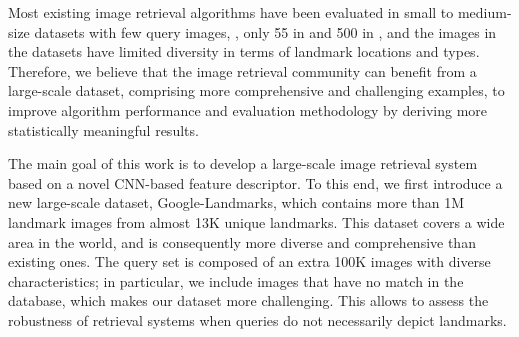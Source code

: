 \documentclass[10pt,twocolumn,letterpaper]{article}
\begin{document}
\iffalse
Despite the recent advances in CNN-based global descriptors for image retrieval, they still suffer from the lack of ability to find patch-level matches between query and database images; it is difficult to retrieve images based on partial matching in the presence of occlusion and background clutter.
In a different recent trend, CNN-based local features are proposed for patch-level matching \cite{han2015matchnet,zagoruyko2015learning,yi2016lift}.
However, these techniques are not optimized specifically for image retrieval and consequently show limited accuracy in practice.
As a result, image retrieval systems relying on long-standing hand-crafted features, such as SIFT~\cite{Lowe2004} or CONGAS~\cite{buddemeier2012systems}, are still widely used.
\fi

Most existing image retrieval algorithms have been evaluated in small to medium-size datasets with few query images, \ie, only 55 in \cite{Philbin07,Philbin2008} and 500 in \cite{Jegou2008}, and the images in the datasets have limited diversity in terms of landmark locations and types.
Therefore, we believe that the image retrieval community can benefit from a large-scale dataset, comprising more comprehensive and challenging examples, to improve algorithm performance and  evaluation methodology by deriving more statistically meaningful results.






The main goal of this work is to develop a large-scale image retrieval system based on a novel CNN-based feature descriptor.
To this end, we first introduce a new large-scale dataset, Google-Landmarks, which contains more than 1M landmark images from almost 13K unique landmarks.
This dataset covers a wide area in the world, and is consequently more diverse and comprehensive than existing ones.
The query set is composed of an extra 100K images with diverse characteristics; in particular, we include images that have no match in the database, which makes our dataset more challenging.
This allows to assess the robustness of retrieval systems when queries do not necessarily depict landmarks.
\end{document}
